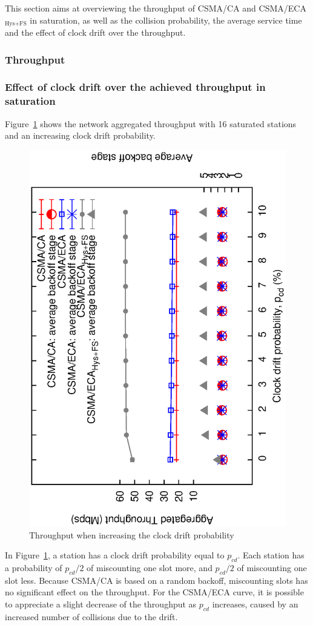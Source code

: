 \documentclass[a4paper,journal]{IEEEtran}
\begin{document}
	This section aims at overviewing the throughput of CSMA/CA and CSMA/ECA$_{\text{Hys+FS}}$  in saturation, as well as the collision probability, the average service time and the effect of clock drift over the throughput.
	
	\subsubsection{Throughput}
	
	
	\subsubsection{Effect of clock drift over the achieved throughput in saturation}
	
	Figure~\ref{fig:clockDrift} shows the network aggregated throughput with 16 saturated stations and an increasing clock drift probability.
	
	\begin{figure}[htbp]
	\centering
		\includegraphics[width=0.7\linewidth,angle=-90]{figures/clockDrift/throughput_and_BOS_w_SD.eps}
		\caption{Throughput when increasing the clock drift probability}
		\label{fig:clockDrift}
	\end{figure}
	
	In Figure~\ref{fig:clockDrift}, a station has a clock drift probability equal to $p_{cd}$. Each station has a probability of $p_{cd}/2$ of miscounting one slot more, and $p_{cd}/2$ of miscounting one slot less. Because CSMA/CA is based on a random backoff, miscounting slots has no significant effect on the throughput. For the CSMA/ECA curve, it is possible to appreciate a slight decrease of the throughput as $p_{cd}$ increases, caused by an increased number of collisions due to the drift.
	
\end{document}

